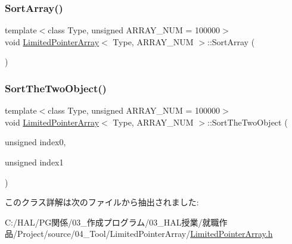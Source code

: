 \subsubsection{\texorpdfstring{Sort\+Array()}{SortArray()}}
{\footnotesize\ttfamily template$<$class Type, unsigned A\+R\+R\+A\+Y\+\_\+\+N\+UM = 100000$>$ \\
void \mbox{\hyperlink{class_limited_pointer_array}{Limited\+Pointer\+Array}}$<$ Type, A\+R\+R\+A\+Y\+\_\+\+N\+UM $>$\+::Sort\+Array (\begin{DoxyParamCaption}{ }\end{DoxyParamCaption})\hspace{0.3cm}{\ttfamily [inline]}}

\mbox{\label{class_limited_pointer_array_a0d33dc5dd8ed01bb00accd6378aa1b47}} 
\subsubsection{\texorpdfstring{Sort\+The\+Two\+Object()}{SortTheTwoObject()}}
{\footnotesize\ttfamily template$<$class Type, unsigned A\+R\+R\+A\+Y\+\_\+\+N\+UM = 100000$>$ \\
void \mbox{\hyperlink{class_limited_pointer_array}{Limited\+Pointer\+Array}}$<$ Type, A\+R\+R\+A\+Y\+\_\+\+N\+UM $>$\+::Sort\+The\+Two\+Object (\begin{DoxyParamCaption}\item[{unsigned}]{index0,  }\item[{unsigned}]{index1 }\end{DoxyParamCaption})\hspace{0.3cm}{\ttfamily [inline]}}



このクラス詳解は次のファイルから抽出されました\+:\begin{DoxyCompactItemize}
\item 
C\+:/\+H\+A\+L/\+P\+G関係/03\+\_\+作成プログラム/03\+\_\+\+H\+A\+L授業/就職作品/\+Project/source/04\+\_\+\+Tool/\+Limited\+Pointer\+Array/\mbox{\hyperlink{_limited_pointer_array_8h}{Limited\+Pointer\+Array.\+h}}\end{DoxyCompactItemize}
